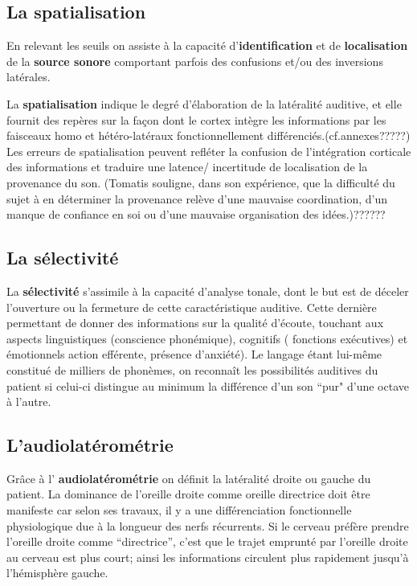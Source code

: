 \subsection{La spatialisation}

  


En relevant les seuils on assiste à la capacité 
d'\textbf{identification} et de \textbf{localisation} de la
\textbf{source sonore} comportant parfois des confusions et/ou des inversions
latérales.

La \textbf{spatialisation}
indique le degré d'élaboration de la latéralité auditive,
et elle fournit des repères sur la façon dont le cortex intègre les informations
par les faisceaux homo et hétéro-latéraux fonctionnellement différenciés.(cf.annexes?????)
Les erreurs de spatialisation peuvent refléter la confusion
de l'intégration corticale des informations et traduire une latence/
incertitude de localisation de la provenance du son.
(Tomatis souligne, dans son expérience, que la difficulté du sujet à en déterminer la provenance relève d'une mauvaise coordination, d'un manque de confiance en soi ou
d'une mauvaise organisation des idées.)??????


\subsection{La sélectivité}

  
  La \textbf{sélectivité }s'assimile  à  la capacité d'analyse tonale,\autocite{tomatis:loreille} dont 
le but est de déceler l'ouverture ou la fermeture de cette
caractéristique auditive. Cette dernière permettant de donner des informations sur la
qualité d'écoute, touchant aux aspects  linguistiques (conscience
phonémique), cognitifs ( fonctions exécutives) et émotionnels action
efférente, présence d'anxiété).
Le langage étant lui-même constitué de milliers de phonèmes, on reconnaît les possibilités auditives du patient si celui-ci  distingue au minimum la différence d'un son ``pur" d'une octave à l'autre.  


\subsection{ L'audiolatérométrie}
  
Grâce à l'\textbf{ audiolatérométrie} on définit  la latéralité droite ou gauche du patient. La dominance
de l'oreille droite comme oreille directrice doit être manifeste car
selon ses travaux, il y a une différenciation fonctionnelle
physiologique due à la longueur des nerfs récurrents. 
Si le cerveau préfère prendre l'oreille droite comme
``directrice'', c'est que le trajet emprunté par l'oreille droite au cerveau est plus
court;
ainsi
les informations circulent plus rapidement jusqu'à l'hémisphère gauche.


